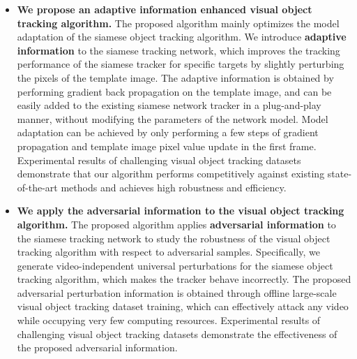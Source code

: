 \begin{itemize}
\item{\textbf{We propose an adaptive information enhanced visual object tracking algorithm.} The proposed algorithm mainly optimizes the model adaptation of the siamese object tracking algorithm. We introduce \textbf{adaptive information} to the siamese tracking network, which improves the tracking performance of the siamese tracker for specific targets by slightly perturbing the pixels of the template image. The adaptive information is obtained by performing gradient back propagation on the template image, and can be easily added to the existing siamese network tracker in a plug-and-play manner, without modifying the parameters of the network model. Model adaptation can be achieved by only performing a few steps of gradient propagation and template image pixel value update in the first frame. Experimental results of challenging visual object tracking datasets demonstrate that our algorithm performs competitively against existing state-of-the-art methods and achieves high robustness and efficiency.}

\item{\textbf{We apply the adversarial information to the visual object tracking algorithm.} The proposed algorithm applies \textbf{adversarial information} to the siamese tracking network to study the robustness of the visual object tracking algorithm with respect to adversarial samples. Specifically, we generate video-independent universal perturbations for the siamese object tracking algorithm, which makes the tracker behave incorrectly. The proposed adversarial perturbation information is obtained through offline large-scale visual object tracking dataset training, which can effectively attack any video while occupying very few computing resources. Experimental results of challenging visual object tracking datasets demonstrate the effectiveness of the proposed adversarial information.}
\end{itemize}

